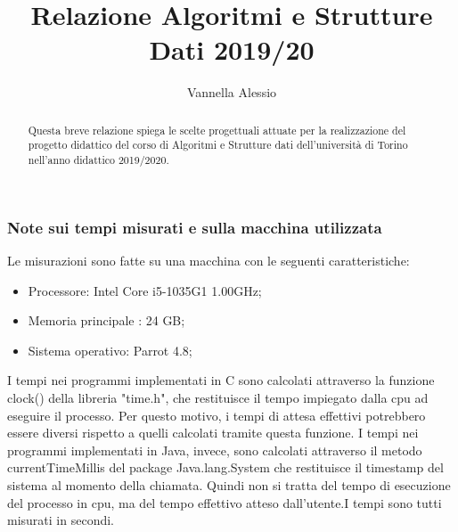 \documentclass{article}
\title{Relazione Algoritmi e Strutture Dati 2019/20}
\author{Vannella Alessio}
\date{}
\begin{document}
\maketitle
\tableofcontents
\begin{abstract}
Questa breve relazione spiega le scelte progettuali attuate per la realizzazione del progetto didattico del corso di Algoritmi e Strutture dati dell'università di Torino nell'anno didattico 2019/2020. 
\end{abstract}
\vfill
\subsubsection*{Note sui tempi misurati e sulla macchina utilizzata}
Le misurazioni sono fatte su una macchina con le seguenti caratteristiche:
\begin{itemize}
    \item Processore: Intel Core i5-1035G1 1.00GHz;
    \item Memoria principale : 24 GB;
    \item Sistema operativo: Parrot 4.8;
\end{itemize}
I tempi nei programmi implementati in C sono calcolati attraverso la funzione clock() della libreria "time.h", che restituisce il tempo impiegato dalla cpu ad eseguire il processo. Per questo motivo, i tempi di attesa effettivi potrebbero essere diversi rispetto a quelli calcolati tramite questa funzione.\newline\newline
I tempi nei programmi implementati in Java, invece, sono calcolati attraverso il metodo currentTimeMillis del package Java.lang.System che restituisce il timestamp del sistema al momento della chiamata. Quindi non si tratta del tempo di esecuzione del processo in cpu, ma del tempo effettivo atteso dall'utente.\newline\newline I tempi sono tutti misurati in secondi.
\newpage



\newpage


 
\newpage

\end{document}
